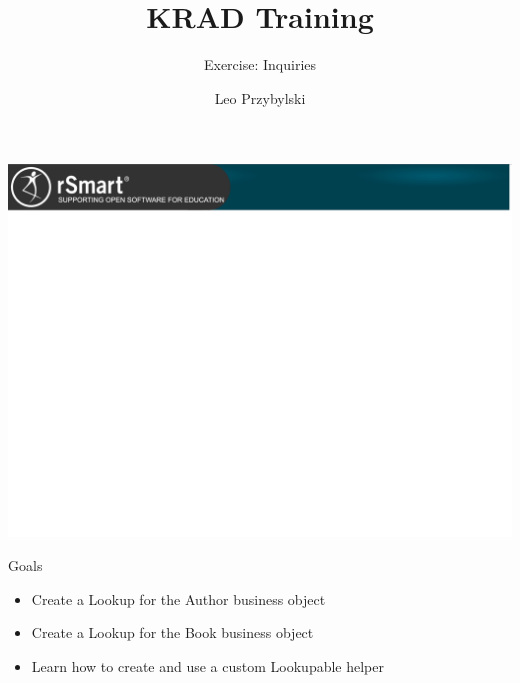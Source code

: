 \documentclass[xcolor=dvipsnames,14pt,professionalfonts]{beamer}
\begin{document}
\title{KRAD Training}
\subtitle{Exercise: Inquiries}
\author[Leo]{Leo Przybylski}

\usebackgroundtemplate%
{%
    \includegraphics[width=\paperwidth,height=\paperheight]{../img/header.png}%
}

{
%
\begin{frame}[plain]
  \titlepage
\end{frame}
}

\begin{frame}{Goals}
  \begin{itemize}
    \item Create a Lookup for the Author business object
    \item Create a Lookup for the Book business object
    \item Learn how to create and use a custom Lookupable helper
  \end{itemize}
\end{frame}
\end{document}
